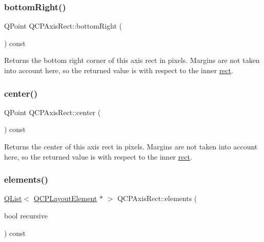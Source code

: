 \subsubsection{\texorpdfstring{bottom\+Right()}{bottomRight()}}
{\footnotesize\ttfamily Q\+Point Q\+C\+P\+Axis\+Rect\+::bottom\+Right (\begin{DoxyParamCaption}{ }\end{DoxyParamCaption}) const\hspace{0.3cm}{\ttfamily [inline]}}

Returns the bottom right corner of this axis rect in pixels. Margins are not taken into account here, so the returned value is with respect to the inner \hyperlink{class_q_c_p_layout_element_a208effccfe2cca4a0eaf9393e60f2dd4}{rect}. \mbox{\label{class_q_c_p_axis_rect_ade3aef874bafcec6dd16174fba44c0b1}} 
\subsubsection{\texorpdfstring{center()}{center()}}
{\footnotesize\ttfamily Q\+Point Q\+C\+P\+Axis\+Rect\+::center (\begin{DoxyParamCaption}{ }\end{DoxyParamCaption}) const\hspace{0.3cm}{\ttfamily [inline]}}

Returns the center of this axis rect in pixels. Margins are not taken into account here, so the returned value is with respect to the inner \hyperlink{class_q_c_p_layout_element_a208effccfe2cca4a0eaf9393e60f2dd4}{rect}. \mbox{\label{class_q_c_p_axis_rect_a3aee067fd105f2fa8de9eb8024435ac5}} 
\subsubsection{\texorpdfstring{elements()}{elements()}\hspace{0.1cm}{\footnotesize\ttfamily [1/2]}}
{\footnotesize\ttfamily \hyperlink{class_q_list}{Q\+List}$<$ \hyperlink{class_q_c_p_layout_element}{Q\+C\+P\+Layout\+Element} $\ast$ $>$ Q\+C\+P\+Axis\+Rect\+::elements (\begin{DoxyParamCaption}\item[{bool}]{recursive }\end{DoxyParamCaption}) const\hspace{0.3cm}{\ttfamily [virtual]}}

